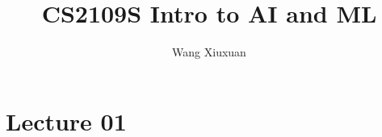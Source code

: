 \documentclass[oneside]{book}
\title{CS2109S Intro to AI and ML}
\author{Wang Xiuxuan}
\begin{document}
\maketitle
\chapter{Lecture 01}

\end{document}
